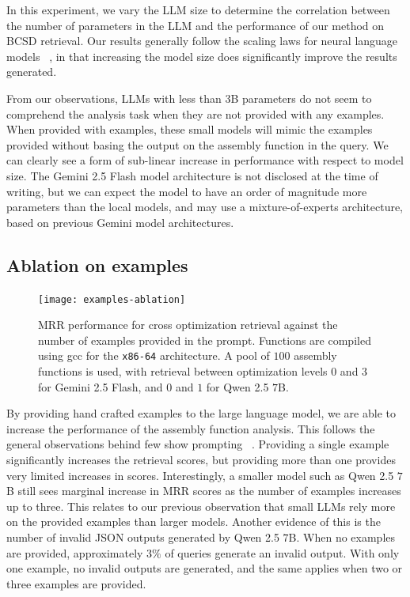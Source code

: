 In this experiment, we vary the LLM size to determine the correlation between the number of parameters in the LLM and the performance
of our method on BCSD retrieval. Our results generally follow the scaling laws for neural language models ~\cite{scaling-laws}, in that increasing
the model size does significantly improve the results generated.

From our observations, LLMs with less than \(3\)B parameters do not seem to comprehend the analysis task when
they are not provided with any examples. When provided with examples, these small models will mimic the examples provided without basing the
output on the assembly function in the query. We can clearly see a form of sub-linear increase in performance with respect to model size.
The Gemini 2.5 Flash model architecture is not disclosed at the time of writing, but we can expect the model to have an order
of magnitude more parameters than the local models, and may use a mixture-of-experts architecture, based on previous Gemini model architectures.

\subsection{Ablation on examples}

\begin{figure}
\centerline{\texttt{[image: examples-ablation]}}
\caption{MRR performance for cross optimization retrieval against the number of examples provided in the prompt. Functions are compiled
using gcc for the \texttt{x86-64} architecture. A pool of \(100\) assembly functions is used, with retrieval between optimization levels \(0\) and \(3\)
for Gemini 2.5 Flash, and \(0\) and \(1\) for Qwen 2.5 \(7\)B.}
\label{ex-abl}
\end{figure}

By providing hand crafted examples to the large language model, we are able to increase the performance of the assembly function analysis.
This follows the general observations behind few show prompting ~\cite{few-shot}. Providing a single example significantly increases the retrieval
scores, but providing more than one provides very limited increases in scores. Interestingly, a smaller model such as Qwen 2.5 \(7\)B still sees
marginal increase in MRR scores as the number of examples increases up to three. This relates to our previous observation
that small LLMs rely more on the provided examples than larger models. Another evidence of this is the number of invalid JSON outputs generated by
Qwen 2.5 \(7\)B. When no examples are provided, approximately \(3\%\) of queries generate an invalid output. With only one example, no invalid
outputs are generated, and the same applies when two or three examples are provided.

